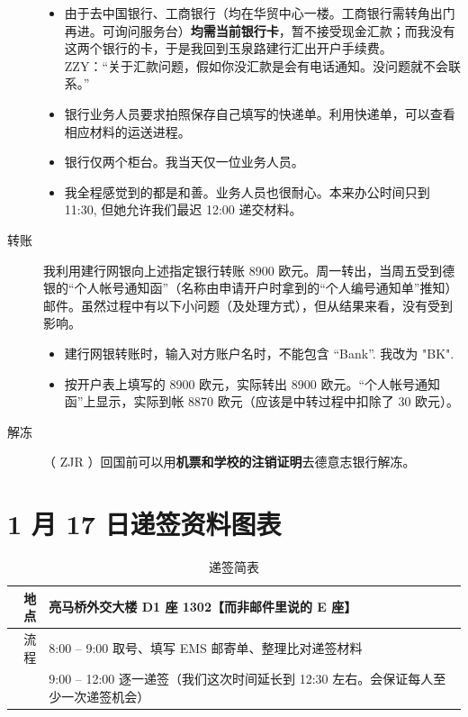 \documentclass[oneside,final]{book}
\begin{document}
\begin{appendices}
\begin{description}
\begin{itemize}
\item 由于去中国银行、工商银行（均在华贸中心一楼。工商银行需转角出门再进。可询问服务台）\textbf{均需\color{blue}当前银行卡}，暂不接受现金汇款；而我没有这两个银行的卡，于是我回到玉泉路建行汇出开户手续费。%
\\
ZZY：“关于汇款问题，假如你没汇款是会有电话通知。没问题就不会联系。”
\item 银行业务人员要求拍照保存自己填写的快递单。利用快递单，可以查看相应材料的运送进程。
\item 银行仅两个柜台。我当天仅一位业务人员。
\item 我全程感觉到的都是{\color{blue}和善}。业务人员也很耐心。本来办公时间只到 11:30, 但她允许我们最迟 12:00 递交材料。
\end{itemize}
\item[转账] 我利用建行网银向上述指定银行转账 8900 欧元。周一转出，当周五受到德银的“个人帐号通知函”（名称由申请开户时拿到的“个人编号通知单”推知）邮件。虽然过程中有以下小问题（及处理方式），但从结果来看，没有受到影响。
\begin{itemize}
  \item 建行网银转账时，输入对方账户名时，不能包含 ``Bank''. 我改为 "BK".
  \item 按开户表上填写的 8900 欧元，实际转出 8900 欧元。“个人帐号通知函”上显示，实际到帐 8870 欧元（应该是中转过程中扣除了 30 欧元）。
\end{itemize} 
\item[解冻] （ ZJR ）回国前可以用\textbf{机票和学校的注销证明}去德意志银行解冻。
\end{description}

\chapter{1 月 17 日递签资料图表}\label{ap:visa-figures}
\begin{table}[htbp]
  \caption{递签简表}
  \centering
  \begin{tabular}{r|l}
    \toprule
    地点 & 亮马桥外交大楼 {\color{blue} D1 座 1302}【而非邮件里说的 E 座】 \\ \midrule
    流程 & 8:00 -- 9:00 取号、填写 EMS 邮寄单、整理比对递签材料 \\
    & 9:00 -- 12:00 逐一递签（我们这次时间延长到 12:30 左右。会保证每人至少一次递签机会） \\
    \bottomrule
  \end{tabular}
\end{table}


\end{appendices}
\end{document}

